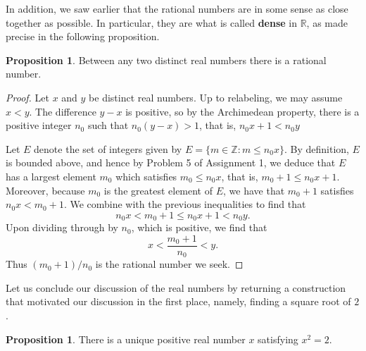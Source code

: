 \documentclass[12pt]{article}
\theoremstyle{definition}
\theoremstyle{theorem}
\newtheorem{proposition}[definition]{Proposition}
\begin{document}
In addition, we saw earlier that the rational numbers are in some sense as close together as possible. In particular, they are what is called \textbf{dense} in $\mathbb{R}$, as made precise in the following proposition. 

\begin{proposition}
Between any two distinct real numbers there is a rational number. 
\end{proposition}

\begin{proof}
Let $x$ and $y$ be distinct real numbers. Up to relabeling, we may assume $x < y$. The difference $y - x$ is positive, so by the Archimedean property, there is a positive integer $n_0$ such that $n_0(y-x) > 1$, that is, $n_0x + 1 < n_0y$

Let $E$ denote the set of integers given by $E = \{m \in \mathbb{Z} : m \leqslant n_0x\}$. By definition, $E$ is bounded above, and hence by Problem 5 of Assignment 1, we deduce that $E$ has a largest element $m_0$ which satisfies $m_0 \leqslant n_0x$, that is, $m_0 + 1 \leqslant n_0x + 1$. Moreover, because $m_0$ is the greatest element of $E$, we have that $m_0 + 1$ satisfies $n_0x < m_0 + 1$. We combine with the previous inequalities to find that 
\[
n_0x < m_0 + 1 \leqslant n_0x + 1 < n_0y.
\]
Upon dividing through by $n_0$, which is positive, we find that 
\[
x < \frac{m_0 + 1}{n_0} < y.
\]
Thus $(m_0 + 1)/n_0$ is the rational number we seek.
\end{proof}

Let us conclude our discussion of the real numbers by returning a construction that motivated our discussion in the first place, namely, finding a square root of $2$. 

\begin{proposition}
There is a unique positive real number $x$ satisfying $x^2 = 2$. 
\end{proposition}
\end{document}
